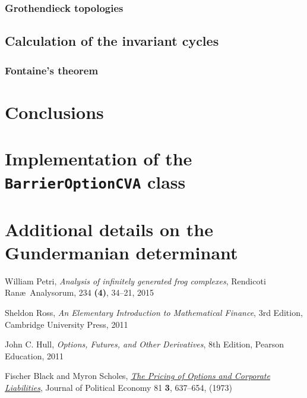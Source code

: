 \documentclass[12pt, oneside]{book}
\theoremstyle{plain}
\theoremstyle{definition}
\begin{document}
\subsection{Grothendieck topologies}
\lipsum[23]

\section{Calculation of the invariant cycles}
\lipsum[23]

\subsection{Fontaine's theorem}
\lipsum[23]

\chapter{Conclusions}
\lipsum[100]

\appendix
\chapter{Implementation of the {\tt BarrierOptionCVA} class}
\lipsum[100]
\chapter[Shorter running title]{Additional details on the Gundermanian determinant}
\lipsum[100]




\begin{thebibliography}{OOO}
   William Petri, 
  {\it Analysis of infinitely generated frog complexes},
	Rendicoti Ran\ae \ Analysorum, 234 {\bf (4)}, 34--21, 2015

  Sheldon Ross, {\it An Elementary Introduction to Mathematical Finance},
	3rd Edition, Cambridge University Press, 2011
	
	John C. Hull, 
	{\it Options, Futures, and Other Derivatives},
	8th Edition, Pearson Education, 2011

	Fischer Black and  Myron Scholes,
	{\it \href{https://www.cs.princeton.edu/courses/archive/fall09/cos323/papers/black_scholes73.pdf}
	{The Pricing of Options and Corporate Liabilities}},
	Journal of Political Economy 81 {\bf 3}, 637--654,  (1973)
	
\end{thebibliography}
\end{document}
